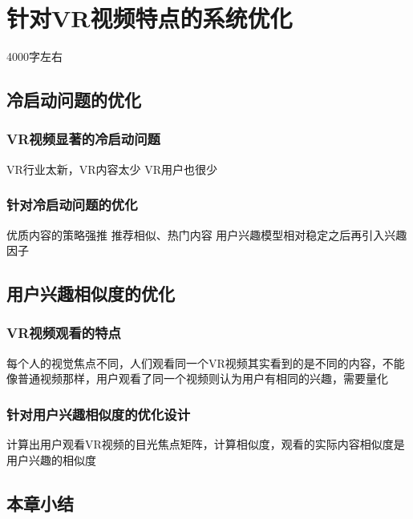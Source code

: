 \chapter{针对VR视频特点的系统优化}
4000字左右

\section{冷启动问题的优化}
\subsection{VR视频显著的冷启动问题}
VR行业太新，VR内容太少
VR用户也很少

\subsection{针对冷启动问题的优化}
优质内容的策略强推
推荐相似、热门内容
用户兴趣模型相对稳定之后再引入兴趣因子

\section{用户兴趣相似度的优化}
\subsection{VR视频观看的特点}
每个人的视觉焦点不同，人们观看同一个VR视频其实看到的是不同的内容，不能像普通视频那样，用户观看了同一个视频则认为用户有相同的兴趣，需要量化

\subsection{针对用户兴趣相似度的优化设计}
计算出用户观看VR视频的目光焦点矩阵，计算相似度，观看的实际内容相似度是用户兴趣的相似度

\section{本章小结}
